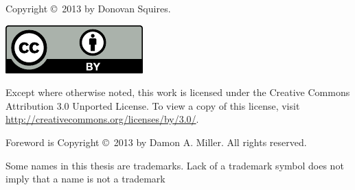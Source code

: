 \null
\vfill

\begin{noindent}
\begin{singlespace}
\begin{centering}

Copyright \copyright~2013 by Donovan Squires.

\medskip

\href{http://creativecommons.org/licenses/by/3.0/}{\includegraphics{./figures/by}}

\medskip
 
Except where otherwise noted, this work is licensed under the Creative Commons Attribution 3.0 Unported License. To view a copy of this license, visit \url{http://creativecommons.org/licenses/by/3.0/}.

\bigskip

Foreword is Copyright \copyright~2013 by Damon A. Miller.  All rights reserved.

\bigskip

Some names in this thesis are trademarks.  Lack of a trademark symbol does not imply that a name is not a trademark

\end{centering}
\end{singlespace}
\end{noindent}